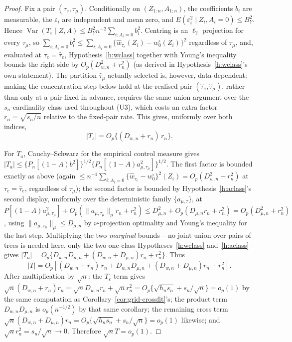 \documentclass[11pt]{article}
\theoremstyle{plain}
\theoremstyle{definition}
\theoremstyle{remark}
\begin{document}
\begin{proof}
Fix a pair $(\tau_e,\tau_\mu)$. Conditionally on $(Z_{1:n},A_{1:n})$, the
coefficients $b_i$ are measurable, the $\varepsilon_i$ are independent and
mean zero, and $E(\varepsilon_i^2\mid Z_i,A_i=0)\le B_Y^2$. Hence
$\operatorname{Var}(T_\varepsilon\mid Z,A)\le B_Y^2n^{-2}\sum_{i:A_i=0}b_i^2$.
Centring is an $\ell_2$ projection for every $\tau_\mu$, so
$\sum_{i:A_i=0}b_i^2\le\sum_{i:A_i=0}\{\widehat w_{\tau_e}(Z_i)-w_0^\circ(Z_i)\}^2$
regardless of $\tau_\mu$, and, evaluated at $\tau_e=\widehat\tau_e$,
Hypothesis~\ref{h:wclass} together with Young's inequality bounds the
right side by $O_p(D_{w,n}^2+r_n^2)$ (as derived in
Hypothesis~\ref{h:wclass}'s own statement). The partition $\widehat\tau_\mu$
actually selected is, however, data-dependent: making the concentration
step below hold at the realised pair $(\widehat\tau_e,\widehat\tau_\mu)$,
rather than only at a pair fixed in advance, requires the same union
argument over the $s_n$-cardinality class used throughout (U3), which costs
an extra factor $r_n=\sqrt{s_n/n}$ relative to the fixed-pair rate. This
gives, uniformly over both indices,
\[
  |T_\varepsilon|=O_p\bigl\{(D_{w,n}+r_n)\,r_n\bigr\}.
\]

For $T_a$, Cauchy--Schwarz for the empirical control measure gives
$|T_a|\le\{P_n[(1-A)b^2]\}^{1/2}\{P_n[(1-A)a_{\mu,\tau_\mu}^2]\}^{1/2}$. The
first factor is bounded exactly as above (again
$\le n^{-1}\sum_{i:A_i=0}\{\widehat w_{\tau_e}-w_0^\circ\}^2(Z_i)
=O_p(D_{w,n}^2+r_n^2)$ at $\tau_e=\widehat\tau_e$, regardless of
$\tau_\mu$); the second factor is bounded by Hypothesis~\ref{h:aclass}'s
second display, uniformly over the deterministic family $\{a_{\mu,\tau}\}$,
at $P[(1-A)a_{\mu,\tau_\mu}^2]+O_p(\|a_{\mu,\tau_\mu}\|_\mu r_n+r_n^2)
\le D_{\mu,n}^2+O_p(D_{\mu,n}r_n+r_n^2)=O_p(D_{\mu,n}^2+r_n^2)$, using
$\|a_{\mu,\tau_\mu}\|_\mu\le D_{\mu,n}$ by $\nu$-projection optimality and
Young's inequality for the last step. Multiplying the two \emph{marginal}
bounds -- no joint union over pairs of trees is needed here, only the two
one-class Hypotheses~\ref{h:wclass}
and~\ref{h:aclass} -- gives
$|T_a|=O_p\{D_{w,n}D_{\mu,n}+(D_{w,n}+D_{\mu,n})r_n+r_n^2\}$. Thus
\[
 |T|
 =O_p\!\left[
 (D_{w,n}+r_n)\,r_n
 +D_{w,n}D_{\mu,n}
 +(D_{w,n}+D_{\mu,n})r_n+r_n^2
 \right].
\]
After multiplication by $\sqrt n$: the $T_\varepsilon$ term gives
$\sqrt n(D_{w,n}+r_n)r_n=\sqrt nD_{w,n}r_n+\sqrt nr_n^2
=O_p\{\sqrt{h_ns_n}+s_n/\sqrt n\}=o_p(1)$ by the same computation as
Corollary~\ref{cor:grid-crossfit}'s; the product term $D_{w,n}D_{\mu,n}$ is
$o_p(n^{-1/2})$ by that same corollary; the remaining cross term
$\sqrt n(D_{w,n}+D_{\mu,n})r_n=O_p\{\sqrt{h_ns_n}+s_n/\sqrt n\}=o_p(1)$
likewise; and $\sqrt nr_n^2=s_n/\sqrt n\to0$. Therefore $\sqrt nT=o_p(1)$.


\end{proof}
\end{document}
